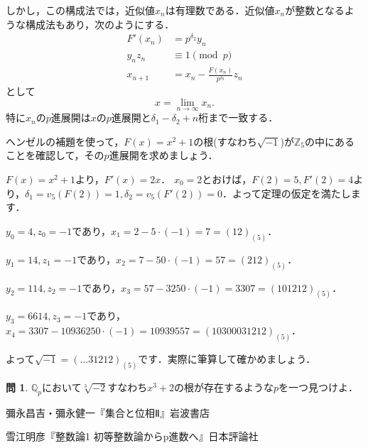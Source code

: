\documentclass[uplatex]{jsarticle}
\newcommand{\Z}{\mathbb{Z}}
\newcommand{\Q}{\mathbb{Q}}
\theoremstyle{definition} %
\newtheorem*{exercise*}{問}
\begin{document}
しかし，この構成法では，近似値$x_n$は有理数である．近似値$x_n$が整数となるような構成法もあり，次のようにする．
\begin{align*}
F'(x_n) &= p^{\delta_2} y_n\\
y_n z_n &\equiv 1 \pmod p\\
x_{n+1} &= x_n - \frac{F(x_n)}{p^{\delta_2}} z_n
\end{align*}
として
\[x = \lim_{n\to\infty}x_n.\]
特に$x_n$の$p$進展開は$x$の$p$進展開と$\delta_1 - \delta_2 + n$桁まで一致する．

ヘンゼルの補題を使って，$F(x) = x^2+1$の根(すなわち$\sqrt{-1}$)が$\Z_5$の中にあることを確認して，その$p$進展開を求めましょう．

$F(x) = x^2+1$より，$F'(x) = 2x$．
$x_0 = 2$とおけば，$F(2) = 5, F'(2) = 4$より，$\delta_1 = v_5(F(2)) = 1, \delta_2 = v_5(F'(2)) = 0$．よって定理の仮定を満たします．

$y_0 = 4, z_0 = -1$であり，$x_1 = 2 - 5 \cdot (-1) = 7 = (12)_{(5)}$．

$y_1 = 14, z_1 = -1$であり，$x_2 = 7 - 50 \cdot (-1) = 57 = (212)_{(5)}$．

$y_2 = 114, z_2 = -1$であり，$x_3 = 57 - 3250 \cdot (-1) = 3307 = (101212)_{(5)}$．

$y_3 = 6614, z_3 = -1$であり，$x_4 = 3307 - 10936250 \cdot (-1) = 10939557 = (10300031212)_{(5)}$．

よって$\sqrt{-1} = (\dots31212)_{(5)}$です．実際に筆算して確かめましょう．

\begin{exercise*}
$\Q_p$において$\sqrt[3]{-2}$すなわち$x^3+2$の根が存在するような$p$を一つ見つけよ．
\end{exercise*}



\begin{thebibliography}{9}
\item 彌永昌吉・彌永健一『集合と位相Ⅱ』岩波書店
\item 雪江明彦『整数論1 初等整数論からp進数へ』日本評論社
\end{thebibliography}
\end{document}
